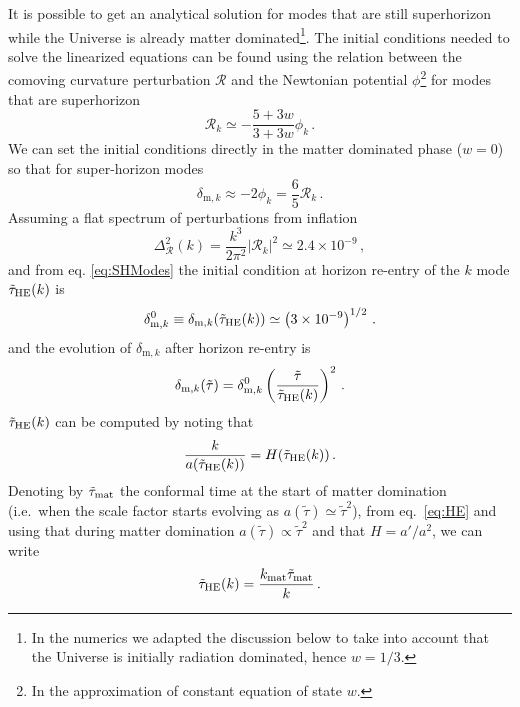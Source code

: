 \documentclass[11pt,a4paper]{article}
\begin{document}
It is possible to get an analytical solution for modes that are still superhorizon while the Universe is already matter dominated\footnote{In the numerics we adapted the discussion below to take into account that the Universe is initially radiation dominated, hence $w = 1/3$.}. The initial conditions needed to solve the linearized equations can be found using the relation between the comoving curvature perturbation $\mathcal{R}$ and the Newtonian potential $\phi$\footnote{In the approximation of constant equation of state $w$.} for modes that are superhorizon
\begin{equation}
\label{eq:RelationCurvaturePotential}
\mathcal{R}_k \simeq - \frac{5 + 3 w}{3 + 3 w} \phi_k \,.
\end{equation}
We can set the initial conditions directly in the matter dominated phase ($w=0$) so that for super-horizon modes
\begin{equation}
\label{eq:SHModes}
\delta_{\text{m},k} \approx- 2 \phi_k = \frac{6}{5} \mathcal{R}_k \,.
\end{equation}
Assuming a flat spectrum of perturbations from inflation
\begin{equation}\Delta_{\mathcal{R}}^2 (k) = \frac{k^3}{2 \pi^2} \left|\mathcal{R}_k\right|^2\simeq 2.4 \times 10^{-9} \,,
\end{equation}
and from eq. \eqref{eq:SHModes} the initial condition at horizon re-entry of the $k$ mode $\tilde\tau_{\rm HE}(k)$ is
\begin{equation}
\delta_{\text{m},k}^0 \equiv \delta_{\text{m},k} (\tilde\tau_{\rm HE}(k)) \simeq \left(3 \times 10^{-9}\right)^{1/2} \,.
\end{equation}
and the evolution of $\delta_{\text{m},k}$ after horizon re-entry is
\begin{equation}
\delta_{\text{m},k} (\tilde\tau) = \delta_{\text{m},k}^0 \left(\frac{\tilde\tau}{\tilde\tau_{\rm HE}(k)}\right)^2 \,.
\end{equation}
$\tilde\tau_{\rm HE}(k)$ can be computed by noting that
\begin{equation}
\label{eq:HE}
\frac{k}{a(\tilde\tau_{\rm HE}(k))} = H(\tilde\tau_{\rm HE}(k)) \,.
\end{equation}
Denoting by $\tilde\tau_{\rm mat}$ the conformal time at the start of matter domination (i.e.~when the scale factor starts evolving as $a(\tilde\tau) \simeq \tilde\tau^2$), from eq.~\eqref{eq:HE} and using that during matter domination $a(\tilde\tau) \propto \tilde\tau^2$ and that $H = a'/a^2$, we can write
\begin{equation}
\label{eq:TauHE}
\tilde\tau_{\rm HE}(k) = \frac{k_{\rm mat} \tilde\tau_{\rm mat}}{k} \,.
\end{equation}
\end{document}
